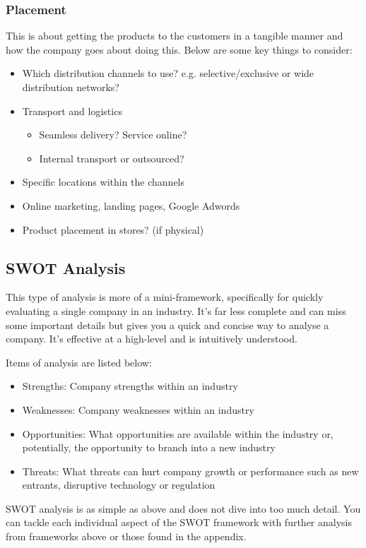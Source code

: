 \documentclass[a4paper]{article}
\begin{document}
{\subsubsection{Placement}
This is about getting the products to the customers in a tangible manner and how the company goes about doing this. Below are some key things to consider:

\begin{itemize}
	\item Which distribution channels to use? e.g. selective/exclusive or wide distribution networks?
	\item Transport and logistics
		\begin{itemize}
			\item Seamless delivery? Service online?
			\item Internal transport or outsourced?
		\end{itemize}
	\item Specific locations within the channels
		\item Online marketing, landing pages, Google Adwords
		\item Product placement in stores? (if physical)
\end{itemize}

\subsection{SWOT Analysis}
This type of analysis is more of a mini-framework, specifically for quickly evaluating a single company in an industry. It's far less complete and can miss some important details but gives you a quick and concise way to analyse a company. It's effective at a high-level and is intuitively understood.

\vspace{5pt}
\noindent Items of analysis are listed below:
\begin{itemize}
	\item Strengths: Company strengths within an industry
	\item Weaknesses: Company weaknesses within an industry
	\item Opportunities: What opportunities are available within the industry or, potentially, the opportunity to branch into a new industry
	\item Threats: What threats can hurt company growth or performance such as new entrants, disruptive technology or regulation
\end{itemize}
SWOT analysis is as simple as above and does not dive into too much detail. You can tackle each individual aspect of the SWOT framework with further analysis from frameworks above or those found in the appendix.


}
\end{document}
